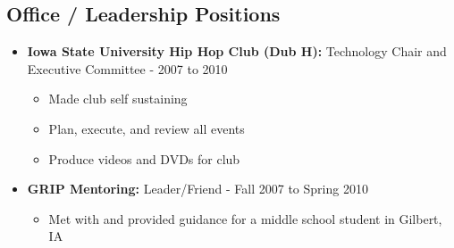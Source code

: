 \documentclass[oneside]{article}
\begin{document}
\subsection{Office / Leadership Positions}

\begin{itemize}

\item{\bf Iowa State University Hip Hop Club (Dub H):} Technology Chair and Executive Committee - 2007 to 2010
\begin{itemize}
  \item Made club self sustaining
  \item Plan, execute, and review all events
  \item Produce videos and DVDs for club
\end{itemize}

\item{\bf GRIP Mentoring:} Leader/Friend - Fall 2007 to Spring 2010
\begin{itemize}
  \item Met with and provided guidance for a middle school student in Gilbert, IA
\end{itemize}


\end{itemize}
\end{document}
